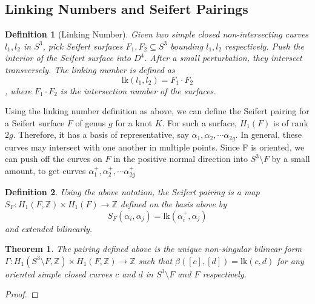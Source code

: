 \documentclass{article}[10pt]
\newtheorem{defn}{Definition}[subsection]
\newtheorem{theorem}{Theorem}[subsection]
\begin{document}
\subsection{Linking Numbers and Seifert Pairings}

\begin{defn}[Linking Number]
\label{defLinkNumber}
Given two simple closed non-intersecting curves $l_{1}, l_{2}$ in $S^{3}$, pick Seifert surfaces $F_{1},F_{2} \subseteq S^{3}$ bounding $l_{1}, l_{2}$ respectively. Push the interior of the Seifert surface into $D^{4}$. After a small perturbation, they intersect transversely. The linking number is defined as $$\mathrm{lk}(l_{1},l_{2})=F_{1} \cdot F_{2}$$, where $F_{1} \cdot F_{2}$ is the intersection number of the surfaces.
\end{defn}

Using the linking number definition as above, we can define the Seifert pairing for a Seifert surface $F$ of genus $g$ for a knot $K$. For such a surface, $H_{1}(F)$ is of rank $2g$. Therefore, it has a basis of representative, say $\alpha_{1}, \alpha_{2},\cdots\alpha_{2g}$. In general, these curves may intersect with one another in multiple points. Since F is oriented, we can push off the curves on $F$ in the positive normal direction into $S^{3}\setminus F$ by a small amount, to get curves $\alpha_{1}^{+},\alpha_{2}^{+},\cdots\alpha_{2g}^{+}$
\begin{defn}
\label{Seifertpairing}
Using the above notation, the Seifert pairing is a map $ S_F: H_{1}(F,\mathbb{Z}) \times H_{1}(F) \to \mathbb{Z}$ defined on the basis above by $$S_F(\alpha_{i},\alpha_{j})=\mathrm{lk}(\alpha_{i}^{+},\alpha_{j})$$ and extended bilinearly.
\end{defn}

\begin{theorem}
\label{SeifPairUniq}
The pairing defined above is the unique non-singular bilinear form $\Gamma:H_{1}(S^{3}\setminus F,\mathbb{Z})\times H_{1}(F,\mathbb{Z})\to \mathbb{Z}$ such that $\beta([c],[d])=\mathrm{lk}(c,d)$ for any oriented simple closed curves $c$ and $d$ in $S^{3}\setminus F$ and $F$ respectively.
\end{theorem}
\begin{proof}

\end{proof}
\end{document}
